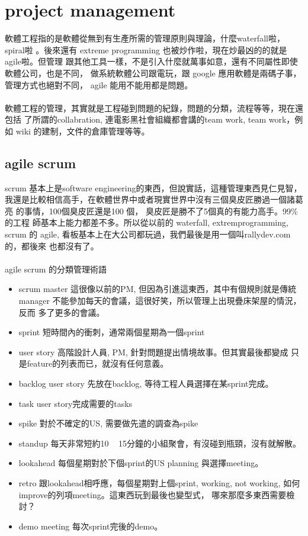 \section{project management}
  軟體工程指的是軟體從無到有生產所需的管理原則與理論，什麼waterfall啦，spiral啦
  。後來還有 extreme programming 也被炒作啦，現在炒最凶的的就是agile啦。但管理
  跟其他工具一樣，不是引入什麼就萬事如意，還有不同屬性即使軟體公司，也是不同，
  做系統軟體公司跟電玩，跟 google 應用軟體是兩碼子事，管理方式也絕對不同，
  agile 能用不能用都是問題。
  \\\\
  軟體工程的管理，其實就是工程碰到問題的紀錄，問題的分類，流程等等，現在還包括
  了所謂的collabration, 連電影黑社會組織都會講的team work, team work，例如 wiki
  的建制，文件的倉庫管理等等。
  \subsection{agile scrum}
  scrum 基本上是software engineering的東西，但說實話，這種管理東西見仁見智，
  我還是比較相信高手，在軟體世界中或者現實世界中沒有三個臭皮匠勝過一個諸葛亮
  的事情，100個臭皮匠還是100 個， 臭皮匠是勝不了5個真的有能力高手。99\%的工程
  師基本上能力都差不多。所以從以前的 waterfall, extremprogramming, scrum 的
  agile, 看板基本上在大公司都玩過，我們最後是用一個叫rallydev.com的，都後來
  也都沒有了。
  \\\\
  agile scrum 的分類管理術語
  \begin{itemize}
    \item scrum master 這很像以前的PM, 但因為引進這東西，其中有個規則就是傳統
      manager 不能參加每天的會議，這很好笑，所以管理上出現疊床架屋的情況，反而
      多了更多的會議。
    \item sprint 短時間內的衝刺，通常兩個星期為一個sprint
    \item user story 高階設計人員, PM, 針對問題提出情境故事。但其實最後都變成
      只是feature的列表而已，就沒有任何意義。
    \item backlog user story 先放在backlog, 等待工程人員選擇在某sprint完成。
    \item task user story完成需要的tasks
    \item spike 對於不確定的US, 需要做先遣的調查為spike
    \item standup 每天非常短約10 ~ 15分鐘的小組聚會，有沒碰到瓶頸，沒有就解散。
    \item lookahead 每個星期對於下個sprint的US planning 與選擇meeting。
    \item retro 跟lookahead相呼應，每個星期對上個sprint, 
      working, not working, 如何improve的列項meeting。這東西玩到最後也變型式，
      哪來那麼多東西需要檢討？
    \item demo meeting 每次sprint完後的demo。
  \end{itemize}

